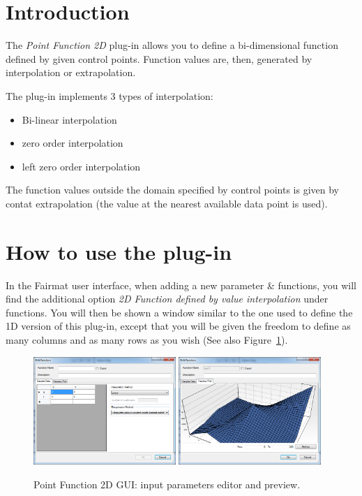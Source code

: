 \newcommand{\pluginName}{Point Function 2D}
\newcommand{\pluginVersion}{1.0.0}



\section{Introduction}
The \emph{Point Function 2D} plug-in allows you to define a bi-dimensional function defined by given control points. Function values are, then, generated by interpolation or extrapolation.

The plug-in implements 3 types of interpolation:
\begin{itemize}
\item Bi-linear interpolation
\item zero order interpolation
\item left zero order interpolation
\end{itemize}

The function values outside the domain specified by control points is given by contat extrapolation (the value at the nearest available data point is used).

\section{How to use the plug-in}
In the Fairmat user interface, when adding a new parameter \& functions, you will find the additional option \emph{2D Function defined by value interpolation} under functions.
You will then be shown a window similar to the one used to define the 1D version of this plug-in, except that you will be given the freedom to define as many columns and as many rows as you wish (See also Figure~\ref{fig.PFunction2DGUI}).

\begin{figure}[h]
\begin{center}
\includegraphics[width=0.48\textwidth]{./images/PFunction2DEdit.png}
\includegraphics[width=0.48\textwidth]{./images/PFunction2DPreview.png}
\caption{Point Function 2D GUI: input parameters editor and preview.}
\label{fig.PFunction2DGUI}
\end{center}
\end{figure}

